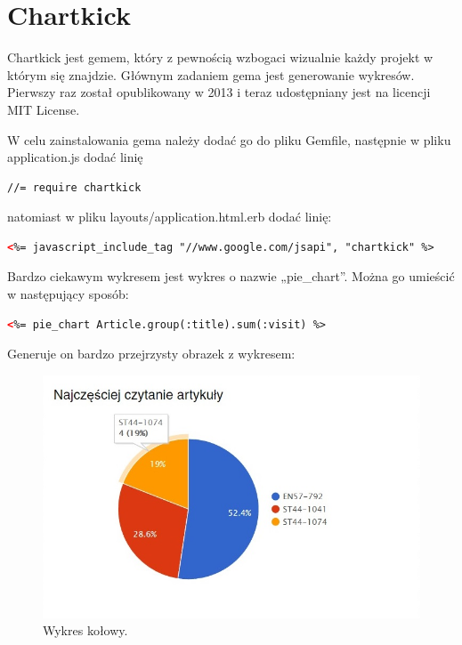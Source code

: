 \documentclass[openright]{xmgr}
\begin{document}
\section{Chartkick}
Chartkick jest gemem, który z pewnością wzbogaci wizualnie każdy projekt w którym się znajdzie. Głównym zadaniem gema jest generowanie wykresów. Pierwszy raz został opublikowany w 2013 i teraz udostępniany jest na licencji MIT License. 

W celu zainstalowania gema należy dodać go do pliku Gemfile, następnie w pliku application.js dodać linię 
\begin{lstlisting}[language=html]
//= require chartkick
\end{lstlisting}
natomiast w pliku layouts/application.html.erb dodać linię:
\begin{lstlisting}[language=html]
<%= javascript_include_tag "//www.google.com/jsapi", "chartkick" %>
\end{lstlisting}
Bardzo ciekawym wykresem jest wykres o nazwie „pie\_chart”. Można go umieścić w następujący sposób:
\begin{lstlisting}[language=html]
<%= pie_chart Article.group(:title).sum(:visit) %>
\end{lstlisting}
Generuje on bardzo przejrzysty obrazek z wykresem:
\begin{figure}[!tbh]
\centering
\includegraphics[width=.6\linewidth]{fig/chartkick}
\caption{Wykres kołowy.\label{RYS.6}}
\end{figure}
\end{document}
